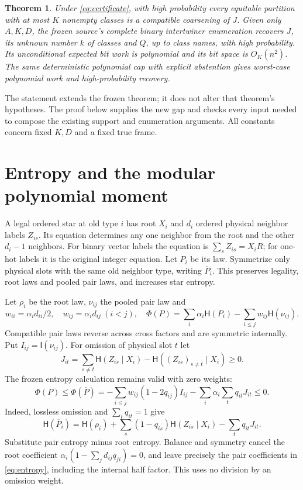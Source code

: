 \documentclass[11pt]{article}
\newtheorem{theorem}{Theorem}
\newcommand{\HH}{\mathsf H}
\newcommand{\II}{\mathsf I}
\begin{document}
\begin{theorem}\label{thm:extension}
Under \eqref{eq:certificate}, with high probability every equitable
partition with at most $K$ nonempty classes is a compatible coarsening
of $J$. Given only $A,K,D$, the frozen source's complete binary
intertwiner enumeration recovers $J$, its unknown number $k$ of classes
and $Q$, up to class names, with high probability. Its unconditional
expected bit work is polynomial and its bit space is $O_K(n^2)$.
The same deterministic polynomial cap with explicit abstention gives
worst-case polynomial work and high-probability recovery.
\end{theorem}

The statement extends the frozen theorem; it does not alter that
theorem's hypotheses. The proof below supplies the new gap and checks
every input needed to compose the existing support and enumeration
arguments. All constants concern fixed $K,D$ and a fixed true frame.

\section{Entropy and the modular polynomial moment}
A legal ordered star at old type $i$ has root $X_i$ and $d_i$ ordered
physical neighbor labels $Z_{is}$. Its equation determines any one
neighbor from the root and the other $d_i-1$ neighbors. For binary
vector labels the equation is $\sum_s Z_{is}=X_iR$; for one-hot labels
it is the original integer equation. Let $P_i$ be its law. Symmetrize
only physical slots with the same old neighbor type, writing
$\overline P_i$. This preserves legality, root laws and pooled pair
laws, and increases star entropy.

Let $\rho_i$ be the root law, $\nu_{ij}$ the pooled pair law and
\[
 w_{ii}=\alpha_id_{ii}/2,\quad
 w_{ij}=\alpha_id_{ij}\ (i<j),\quad
 \Phi(P)=\sum_i\alpha_i\HH(P_i)
              -\sum_{i\le j}w_{ij}\HH(\nu_{ij}).
\]
Compatible pair laws reverse across cross factors and are symmetric
internally. Put $I_{ij}=\II(\nu_{ij})$. For omission of physical slot
$t$ let
\[
 J_{it}=\sum_{s\ne t}\HH(Z_{is}\mid X_i)
              -\HH((Z_{is})_{s\ne t}\mid X_i)\ge0.
\]
The frozen entropy calculation remains valid with zero weights:
\begin{equation}\label{eq:entropy}
 \Phi(P)\le\Phi(\overline P)
 =-\sum_{i\le j}w_{ij}(1-2q_{ij})I_{ij}
   -\sum_i\alpha_i\sum_tq_{it}J_{it}\le0.
\end{equation}
Indeed, lossless omission and $\sum_tq_{it}=1$ give
\[
 \HH(\overline P_i)=\HH(\rho_i)
   +\sum_s(1-q_{is})\HH(Z_{is}\mid X_i)-\sum_tq_{it}J_{it}.
\]
Substitute pair entropy minus root entropy. Balance and symmetry
cancel the root coefficient
$\alpha_i(1-\sum_jd_{ij}q_{ji})=0$, and leave precisely the pair
coefficients in \eqref{eq:entropy}, including the internal half factor.
This uses no division by an omission weight.
\end{document}
